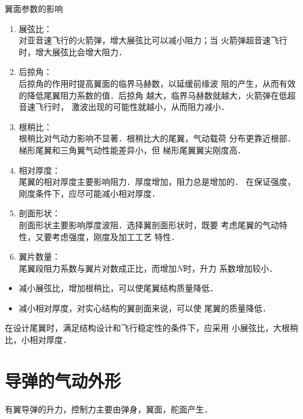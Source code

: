 \begin{notice}
翼面参数的影响
\begin{enumerate}
  \item 展弦比：\\ 
    对亚音速飞行的火箭弹，增大展弦比可以减小阻力；当
    火箭弹超音速飞行时，增大展弦比会增大阻力．
  \item 后掠角：\\ 
    后掠角的作用时提高翼面的临界马赫数，以延缓前缘波
    阻的产生，从而有效的降低尾翼阻力系数的值．后掠角
    越大，临界马赫数就越大，火箭弹在低超音速飞行时，
    激波出现的可能性就越小，从而阻力减小．
  \item 根稍比：\\ 
    根稍比对气动力影响不显著．根稍比大的尾翼，气动载荷
    分布更靠近根部．梯形尾翼和三角翼气动性能差异小，但
    梯形尾翼翼尖刚度高．
  \item 相对厚度：\\ 
    尾翼的相对厚度主要影响阻力．厚度增加，阻力总是增加的．
    在保证强度，刚度条件下，应尽可能减小相对厚度．
  \item 剖面形状：\\ 
    剖面形状主要影响厚度波阻．选择翼剖面形状时，既要
    考虑尾翼的气动特性，又要考虑强度，刚度及加工工艺
    特性．
  \item 翼片数量：\\ 
    尾翼段阻力系数与翼片对数成正比，而增加$N$时，升力
    系数增加较小．
\end{enumerate}
\end{notice}
{\color{blue}
\begin{itemize}
  \item 减小展弦比，增加根稍比，可以使尾翼结构质量降低．
  \item 减小相对厚度，对实心结构的翼剖面来说，可以使
    尾翼的质量降低．
\end{itemize}}
在设计尾翼时，满足结构设计和飞行稳定性的条件下，应采用
小展弦比，大根稍比，小相对厚度．
\section{导弹的气动外形}
有翼导弹的升力，控制力主要由弹身，翼面，舵面产生．

